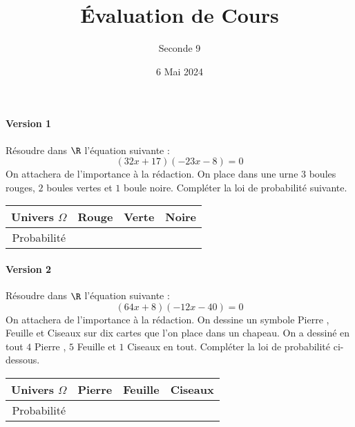 \documentclass{exam}
\title{Évaluation de Cours}
\date{6 Mai 2024}
\author{Seconde 9}
\begin{document}
\maketitle
\thispagestyle{empty}
\paragraph{Version 1}
\begin{questions}
\question Résoudre dans $\R$ l'équation suivante :
\begin{equation*}
(32x + 17)(-23x-8)=0
\end{equation*}
On attachera de l'importance à la rédaction.
\question On place dans une urne $3$ boules rouges, $2$ boules vertes et $1$ boule noire. Compléter la loi de probabilité suivante.
\begin{center}
\begin{tabular}{|c|c|c|c|}
\hline
Univers $\Omega$ & Rouge & Verte & Noire\\
\hline
\rule[-0.4cm]{0pt}{1cm} Probabilité & & &\\
\hline
\end{tabular}
\end{center} 
\end{questions}
\newpage
\maketitle
\thispagestyle{empty}
\paragraph{Version 2}
\begin{questions}
\question Résoudre dans $\R$ l'équation suivante :
\begin{equation*}
(64x + 8)(-12x-40)=0
\end{equation*}
On attachera de l'importance à la rédaction.
\question On dessine un symbole \og Pierre \fg, \og Feuille \fg et \og Ciseaux \fg sur dix cartes que l'on place dans un chapeau. On a dessiné en tout $4$ \og Pierre \fg, $5$ \og Feuille \fg et $1$ \og Ciseaux \fg en tout. Compléter la loi de probabilité ci-dessous.
\begin{center}
\begin{tabular}{|c|c|c|c|}
\hline
Univers $\Omega$ & Pierre & Feuille & Ciseaux\\
\hline
\rule[-0.4cm]{0pt}{1cm} Probabilité & & &\\
\hline
\end{tabular}
\end{center}
\end{questions}
\end{document}
